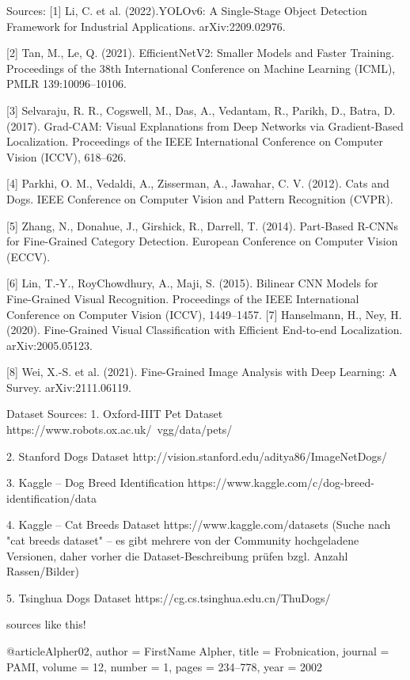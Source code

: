 Sources:
[1] Li, C. et al. (2022).YOLOv6: A Single-Stage Object Detection Framework for Industrial Applications.
arXiv:2209.02976.

[2] Tan, M., Le, Q. (2021). EfficientNetV2: Smaller Models and Faster Training. Proceedings of the 38th
International Conference on Machine Learning (ICML), PMLR 139:10096–10106.

[3] Selvaraju, R. R., Cogswell, M., Das, A., Vedantam, R., Parikh, D., Batra, D. (2017). Grad-CAM: Visual
Explanations from Deep Networks via Gradient-Based Localization. Proceedings of the IEEE International
Conference on Computer Vision (ICCV), 618–626.

[4] Parkhi, O. M., Vedaldi, A., Zisserman, A., Jawahar, C. V. (2012). Cats and Dogs. IEEE Conference on
Computer Vision and Pattern Recognition (CVPR).

[5] Zhang, N., Donahue, J., Girshick, R., Darrell, T. (2014). Part-Based R-CNNs for Fine-Grained Category
Detection. European Conference on Computer Vision (ECCV).

[6] Lin, T.-Y., RoyChowdhury, A., Maji, S. (2015). Bilinear CNN Models for Fine-Grained Visual Recognition.
Proceedings of the IEEE International Conference on Computer Vision (ICCV), 1449–1457.
[7] Hanselmann, H., Ney, H. (2020). Fine-Grained Visual Classification with Efficient End-to-end Localization.
arXiv:2005.05123.

[8] Wei, X.-S. et al. (2021). Fine-Grained Image Analysis with Deep Learning: A Survey. arXiv:2111.06119.



Dataset Sources:
1. Oxford-IIIT Pet Dataset
https://www.robots.ox.ac.uk/~vgg/data/pets/

2. Stanford Dogs Dataset
http://vision.stanford.edu/aditya86/ImageNetDogs/

3. Kaggle – Dog Breed Identification
https://www.kaggle.com/c/dog-breed-identification/data

4. Kaggle – Cat Breeds Dataset
https://www.kaggle.com/datasets (Suche nach "cat breeds dataset" – es gibt mehrere von der Community hochgeladene Versionen, daher vorher die Dataset-Beschreibung prüfen bzgl. Anzahl Rassen/Bilder)

5. Tsinghua Dogs Dataset
https://cg.cs.tsinghua.edu.cn/ThuDogs/




sources like this!

@article{Alpher02,
author = {FirstName Alpher},
title = {Frobnication},
journal = PAMI,
volume = 12,
number = 1,
pages = {234--778},
year = 2002
}



